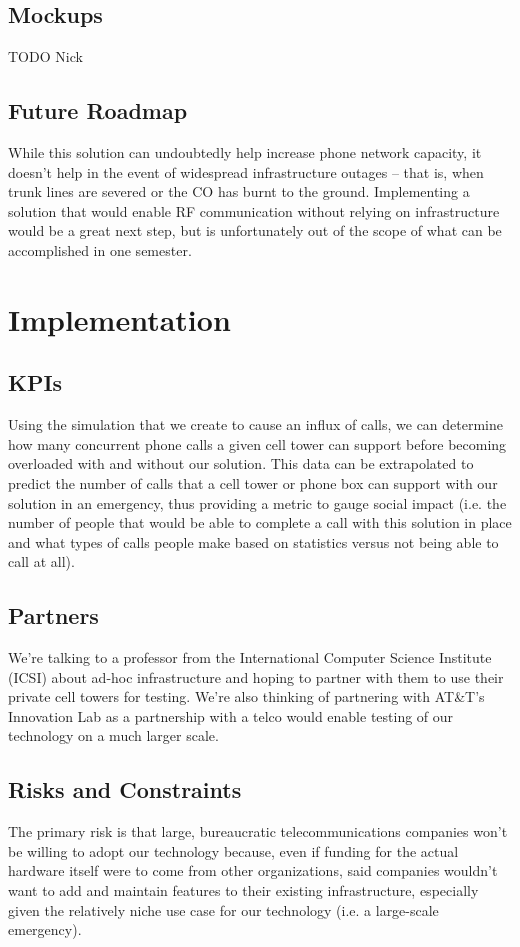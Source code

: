 \documentclass[10pt]{article}
\begin{document}
\subsection*{Mockups}
TODO Nick

\subsection*{Future Roadmap}
While this solution can undoubtedly help increase phone network capacity, it
doesn't help in the event of widespread infrastructure outages -- that is, when
trunk lines are severed or the CO has burnt to the ground.  Implementing
a solution that would enable RF communication without relying on infrastructure
would be a great next step, but is unfortunately out of the scope of what can be
accomplished in one semester.

\section{Implementation}
\subsection*{KPIs}
Using the simulation that we create to cause an influx of calls, we can
determine how many concurrent phone calls a given cell tower can support before
becoming overloaded with and without our solution.  This data can be
extrapolated to predict the number of calls that a cell tower or phone box can
support with our solution in an emergency, thus providing a metric to gauge
social impact (i.e. the number of people that would be able to complete a call
with this solution in place and what types of calls people make based on
statistics versus not being able to call at all).

\subsection*{Partners}
We're talking to a professor from the International Computer Science Institute
(ICSI) about ad-hoc infrastructure and hoping to partner with them to use their
private cell towers for testing. We're also thinking of partnering with AT\&T's
Innovation Lab as a partnership with a telco would enable testing of our
technology on a much larger scale.

\subsection*{Risks and Constraints}
The primary risk is that large, bureaucratic telecommunications companies won't
be willing to adopt our technology because, even if funding for the actual
hardware itself were to come from other organizations, said companies wouldn't
want to add and maintain features to their existing infrastructure, especially
given the relatively niche use case for our technology (i.e. a large-scale
emergency).
\end{document}
